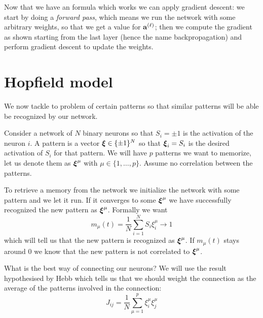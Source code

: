 \documentclass[12pt]{extarticle}
\renewcommand{\vec}[1]{\bvec{#1}}
\begin{document}
Now that we have an formula which works we can apply gradient descent: we start by doing a
\emph{forward pass}, which means we run the network with some arbitrary weights, so that we get a
value for $\vec a^{(\ell)}$; then we compute the gradient as shown starting from the last layer
(hence the name backpropagation) and perform gradient descent to update the weights.

\section{Hopfield model}

We now tackle to problem of  certain patterns so that similar patterns will be able
be recognized by our network.

Consider a network of $N$ binary neurons so that $S_i = \pm 1$ is the activation of the neuron $i$.
A pattern is a vector $\vec \xi \in \{\pm 1\}^N$ so that $\vec \xi_i = S_i$ is the desired
activation of $S_i$ for that pattern. We will have $p$ patterns we want to memorize, let us denote
them as $\vec \xi^\mu$ with $\mu \in \{1, \dots, p\}$.
Assume no correlation between the patterns.

To retrieve a memory from the network we initialize the network with some pattern and we let it run.
If it converges to some $\vec \xi^\mu$ we have successfully recognized the new pattern as
$\vec \xi^\mu$. Formally we want
\begin{equation}
	m_\mu(t) = \frac{1}{N} \sum_{i = 1}^N S_i \xi^\mu_i \to 1
\end{equation}
which will tell us that the new pattern is recognized as $\vec \xi^\mu$. If $m_\mu(t)$ stays around
$0$ we know that the new pattern is not correlated to $\vec \xi^\mu$.

What is the best way of connecting our neurons? We will use the result hypothesised by Hebb which
tells us that we should weight the connection as the average of the patterns involved in the
connection:
\begin{equation}
	J_{ij} = \frac{1}{N} \sum_{\mu = 1}^p \xi_i^\mu \xi_j^\mu
\end{equation}
\end{document}
